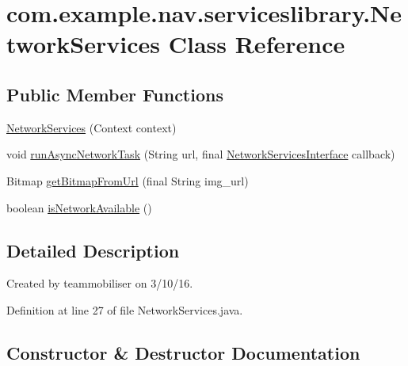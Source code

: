 \hypertarget{classcom_1_1example_1_1nav_1_1serviceslibrary_1_1_network_services}{}\section{com.\+example.\+nav.\+serviceslibrary.\+Network\+Services Class Reference}
\label{classcom_1_1example_1_1nav_1_1serviceslibrary_1_1_network_services}
\subsection*{Public Member Functions}
\begin{DoxyCompactItemize}
\item 
\hyperlink{classcom_1_1example_1_1nav_1_1serviceslibrary_1_1_network_services_a062512106f8ab19d2c18ba9ccd4d282e}{Network\+Services} (Context context)
\item 
void \hyperlink{classcom_1_1example_1_1nav_1_1serviceslibrary_1_1_network_services_a759df34e9573fb772d81d81990b7b63e}{run\+Async\+Network\+Task} (String url, final \hyperlink{interfacecom_1_1example_1_1nav_1_1serviceslibrary_1_1_network_services_interface}{Network\+Services\+Interface} callback)
\item 
Bitmap \hyperlink{classcom_1_1example_1_1nav_1_1serviceslibrary_1_1_network_services_ae923a67946d7b2cbab0fa31a45d43ac7}{get\+Bitmap\+From\+Url} (final String img\+\_\+url)
\item 
boolean \hyperlink{classcom_1_1example_1_1nav_1_1serviceslibrary_1_1_network_services_a54d504de28652c87840d1375a46c4be8}{is\+Network\+Available} ()
\end{DoxyCompactItemize}


\subsection{Detailed Description}
Created by teammobiliser on 3/10/16. 

Definition at line 27 of file Network\+Services.\+java.



\subsection{Constructor \& Destructor Documentation}
